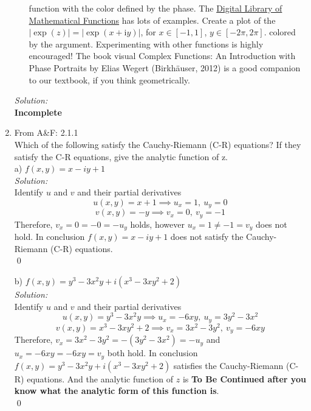 \documentclass[10pt]{amsart}
\newcommand{\I}{\mathrm{i}}
\theoremstyle{nonumberplain}
\begin{document}
\begin{enumerate}[label={\bf {\arabic*}:}]
\begin{itemize}
function with the color defined by the phase. The \href{https://dlmf.nist.gov/}{Digital Library of
Mathematical Functions} has lots of examples. Create a plot of the
$|\exp (z)|=|\exp (x+\I y)|$, for $x \in[-1,1]$, $y \in[-2 \pi, 2
\pi]$. colored by the argument. Experimenting with other functions is
highly encouraged! The book visual Complex Functions: An Introduction
with Phase Portraits by Elias Wegert (Birkhäuser, 2012) is a good
companion to our textbook, if you think geometrically.
\end{itemize}
\textit{Solution:} \\
\textbf{Incomplete} \\
\item From A\&F: 2.1.1 \\
Which of the following satisfy the Cauchy-Riemann (C-R) equations? If they satisfy the C-R equations, give the analytic function of z. \\
a) $f(x, y) = x - iy + 1$ \\
\textit{Solution:} \\
Identify $u$ and $v$ and their partial derivatives
$$ u(x,y) = x + 1 \implies u_x = 1, \: u_y = 0$$
$$v(x,y) = - y \implies v_x = 0, \: v_y = -1$$
Therefore, $v_x = 0 = - 0 = - u_y$ holds, however $u_x = 1 \neq - 1 = v_y$ does not hold.
In conclusion $f(x, y) = x - iy + 1$ does not satisfy the Cauchy-Riemann (C-R) equations.\\
\qed

\noindent
b) $f(x, y) = y^3 - 3x^2y + i(x^3 - 3xy^2 + 2)$ \\
\textit{Solution:} \\
Identify $u$ and $v$ and their partial derivatives
$$ u(x,y) = y^3 - 3x^2y \implies u_x = -6xy, \: u_y = 3y^2 -3x^2$$
$$v(x,y) = x^3 - 3xy^2 + 2 \implies v_x = 3x^2 - 3y^2, \: v_y = -6xy$$
Therefore, $v_x = 3x^2 - 3y^2 = - (3y^2 -3x^2) = - u_y$ and $u_x = -6xy = -6xy = v_y$ both hold.
In conclusion $f(x, y) = y^3 - 3x^2y + i(x^3 - 3xy^2 + 2)$ satisfies the Cauchy-Riemann (C-R) equations.
And the analytic function of $z$ is \textbf{To Be Continued after you know what the analytic form of this function is}. \\
\qed


\end{enumerate}
\end{document}

